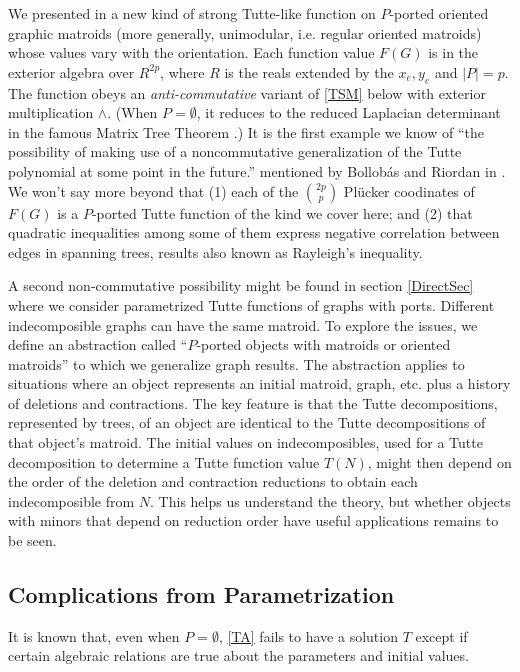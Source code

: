 \documentclass[12pt,leqno]{amsart}
\theoremstyle{remark}
\begin{document}
We presented in  \cite{TutteEx}
a new kind of strong Tutte-like function on $P$-ported oriented graphic
matroids (more generally, unimodular, i.e. regular oriented matroids)
whose values vary with the orientation.   
Each function value $F(G)$ is
in the exterior algebra over $R^{2p}$, where $R$ is
the reals extended by the $x_e, y_e$ 
and $|P|=p$.  The function
obeys an \emph{anti-commutative} variant of \eqref{TSM} below
with exterior multiplication $\wedge$.  
(When $P=\emptyset$, it reduces 
to the reduced Laplacian determinant in the
famous Matrix Tree Theorem \cite{HararyBook,sdcMTT}.)  
It is the first example we know
of
``the possibility of making use of a noncommutative generalization of the Tutte
polynomial at some point in the future.'' mentioned by Bollob\'{a}s and
Riordan in \cite{BollobasRiordanTuttePolyColored}.  We won't say
more beyond that (1) each of the $\binom{2p}{p}$
Pl\"{u}cker coodinates of $F(G)$ is a $P$-ported Tutte function
of the kind we cover here; and (2) that quadratic inequalities among
some of them express negative correlation between edges in spanning trees,
results also known as Rayleigh's inequality\cite{Raleighs}.

A second non-commutative possibility might be found in 
section \ref{DirectSec} where
we consider parametrized Tutte functions of graphs with ports.
Different indecomposible
graphs can have the same matroid\cite{Ellis-Monaghan-Traldi}.  
To explore the issues,
we define an abstraction 
called ``$P$-ported objects with matroids
or oriented matroids'' to which we generalize graph results.
The abstraction applies to situations where
an object represents an initial matroid, graph, etc. plus
a history of deletions and contractions.  
The key feature is that the Tutte decompositions, represented 
by trees, of an object are identical to the Tutte decompositions
of that object's matroid.
The initial values
on indecomposibles, 
used for a Tutte decomposition to determine a Tutte function value
$T(N)$,
might then depend on the order of the deletion and contraction
reductions
to obtain each indecomposible from $N$.  This helps us understand the
theory, but whether objects with minors that depend on reduction 
order have useful applications remains to be seen.

\subsection{Complications from Parametrization}
\label{Complications}
It is known that,  even when $P=\emptyset$,
\eqref{TA} fails to have a solution
$T$ except if certain algebraic relations are true 
about the parameters and
initial values.
\end{document}
